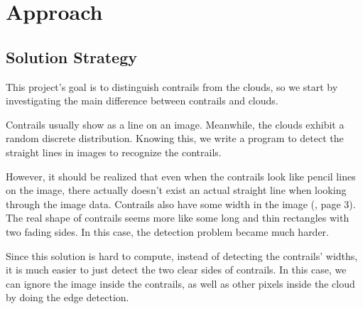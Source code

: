 \chapter{Approach}

\section{Solution Strategy}

This project’s goal is to distinguish contrails from the clouds, so we start
by investigating the main difference between contrails and clouds.

Contrails usually show as a line on an image. Meanwhile, the clouds
exhibit a random discrete distribution. Knowing this, we write a program
to detect the straight lines in images to recognize the contrails.

However, it should be realized that even when the contrails look like pencil
lines on the image, there actually doesn’t exist an actual straight line
when looking through the image data. Contrails also have some width in
the image (\cite{CONTRAILS_FACTS}, page 3). The real shape of contrails seems more like
some long and thin rectangles with two fading sides. In this case, the
detection problem became much harder.

Since this solution is hard to compute, instead of detecting the contrails’ widths,
it is much easier to just detect the two clear sides of contrails. In this case,
we can ignore the image inside the contrails, as well as other pixels inside
the cloud by doing the edge detection.

